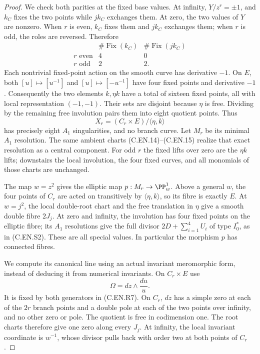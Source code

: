 \begin{proof}
We check both parities at the fixed base values.
At infinity, $Y/z^r=\pm1$, and $k_C$
fixes the two points while $jk_C$ exchanges
them. At zero, the two values of $Y$ are
nonzero. When $r$ is even, $k_C$ fixes
them and $jk_C$ exchanges them; when $r$
is odd, the roles are reversed. Therefore
\[
 \begin{array}{c|cc}
 &\#\operatorname{Fix}(k_C)&
       \#\operatorname{Fix}(jk_C)\\ \hline
 r\text{ even}&4&0\\
 r\text{ odd}&2&2 .
 \end{array}                                             \tag{C.EN.R8}
\]
Each nontrivial fixed-point action on the
smooth curve has derivative $-1$.
On $E$, both $[u]\mapsto[u^{-1}]$
and $[u]\mapsto[-u^{-1}]$ have four
fixed points and derivative $-1$.
Consequently the two elements $k,\eta k$
have a total of sixteen fixed points,
all with local representation $(-1,-1)$.
Their sets are disjoint because $\eta$
is free. Dividing by the remaining free
involution pairs them into eight quotient
points. Thus
\[
 X_r=(C_r\times E)/\langle\eta,k\rangle
                                                               \tag{C.EN.R9}
\]
has precisely eight $A_1$ singularities,
and no branch curve. Let $M_r$ be its
minimal $A_1$ resolution. The same
ambient charts (C.EN.14)--(C.EN.15)
realize that exact resolution as a
central component. For odd $r$ the
fixed lifts over zero are the
$\eta k$ lifts; downstairs the local
involution, the four fixed curves,
and all monomials of those charts
are unchanged.

The map $w=z^2$ gives the elliptic map
$p:M_r\to\PP^1_w$. Above a general $w$,
the four points of $C_r$ are acted on
transitively by $\langle\eta,k\rangle$,
so its fibre is exactly $E$. At $w=j^2$,
the local double-root chart and the free
translation in $\eta$ give a smooth
double fibre $2J_j$. At zero and infinity,
the involution has four fixed points on
the elliptic fibre; its $A_1$ resolutions
give the full divisor
$2D+\sum_{i=1}^4 U_i$ of type $I_0^*$,
as in (C.EN.S2). These are all special
values. In particular the morphism $p$
has connected fibres.

We compute its canonical line using an
actual invariant meromorphic form,
instead of deducing it from numerical
invariants. On $C_r\times E$ use
\[
                       \Omega=dz\wedge\frac{du}{u}.
                                                               \tag{C.EN.R10}
\]
It is fixed by both generators in
(C.EN.R7). On $C_r$, $dz$ has a simple
zero at each of the $2r$ branch points
and a double pole at each of the two
points over infinity, and no other
zero or pole. The quotient is free
in codimension one. The root charts
therefore give one zero along every
$J_j$. At infinity, the local invariant
coordinate is $w^{-1}$, whose divisor
pulls back with order two at both
points of $C_r$.


\end{proof}
